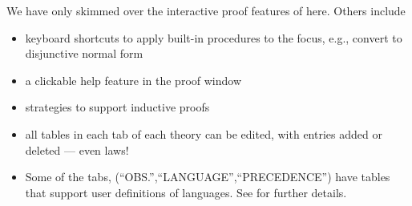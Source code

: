 \noindent
We have only skimmed over the interactive proof features of  here.
Others include
\begin{itemize}
  \item keyboard shortcuts to apply built-in procedures to the focus,
    e.g., convert to disjunctive normal form
  \item
    a clickable help feature in the proof window
  \item strategies to support inductive proofs
  \item
    all tables in each tab of each theory can be edited, with entries added
    or deleted --- even laws!
  \item
    Some of the tabs, (``OBS.'',``LANGUAGE'',``PRECEDENCE'') have
    tables that support user definitions of languages.
    See \cite{conf/utp/Butterfield12} for further details.
\end{itemize}
